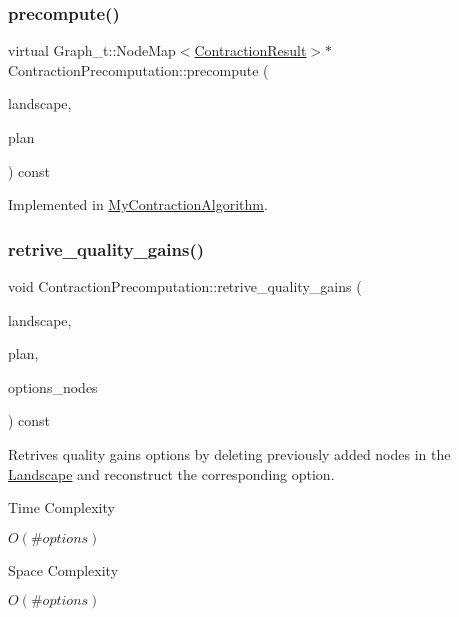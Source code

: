 \subsubsection{\texorpdfstring{precompute()}{precompute()}}
{\footnotesize\ttfamily virtual Graph\+\_\+t\+::\+Node\+Map$<$\hyperlink{class_contraction_result}{Contraction\+Result}$>$$\ast$ Contraction\+Precomputation\+::precompute (\begin{DoxyParamCaption}\item[{const \hyperlink{class_landscape}{Landscape} \&}]{landscape,  }\item[{const \hyperlink{class_restoration_plan}{Restoration\+Plan} \&}]{plan }\end{DoxyParamCaption}) const\hspace{0.3cm}{\ttfamily [pure virtual]}}



Implemented in \hyperlink{class_my_contraction_algorithm_a4583c564e68d337bd9dcef315093bbe6}{My\+Contraction\+Algorithm}.

\mbox{\label{class_contraction_precomputation_a6749c81605043e4398c80b49293b44c6}} 
\subsubsection{\texorpdfstring{retrive\+\_\+quality\+\_\+gains()}{retrive\_quality\_gains()}}
{\footnotesize\ttfamily void Contraction\+Precomputation\+::retrive\+\_\+quality\+\_\+gains (\begin{DoxyParamCaption}\item[{\hyperlink{class_landscape}{Landscape} \&}]{landscape,  }\item[{\hyperlink{class_restoration_plan}{Restoration\+Plan} \&}]{plan,  }\item[{const std\+::vector$<$ std\+::vector$<$ Graph\+\_\+t\+::\+Arc $>$$>$ \&}]{options\+\_\+nodes }\end{DoxyParamCaption}) const}

Retrives quality gains options by deleting previously added nodes in the \hyperlink{class_landscape}{Landscape} and reconstruct the corresponding option.

\begin{DoxyRefDesc}{Time Complexity}
\item[\hyperlink{time__time000004}{Time Complexity}]$O(\#options)$ \end{DoxyRefDesc}
\begin{DoxyRefDesc}{Space Complexity}
\item[\hyperlink{space__space000004}{Space Complexity}]$O(\#options)$ \end{DoxyRefDesc}


